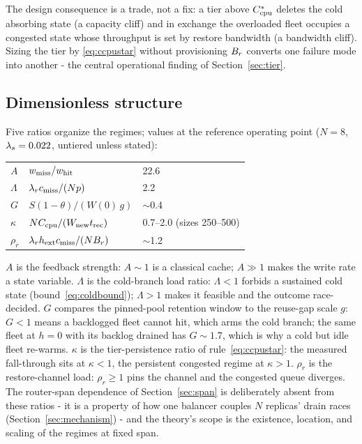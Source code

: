 The design consequence is a trade, not a fix: a tier above $C_{\mathrm{cpu}}^*$
deletes the cold absorbing state (a capacity cliff) and in exchange
the overloaded fleet occupies a congested state whose throughput is
set by restore bandwidth (a bandwidth cliff). Sizing the tier by \eqref{eq:ccpustar}
without provisioning $B_r$ converts one failure mode into another -
the central operational finding of Section~\ref{sec:tier}.

\subsection{Dimensionless structure}
\label{sec:dimensionless}

Five ratios organize the regimes; values at the reference operating
point ($N = 8$, $\lambda_s = 0.022$, untiered unless stated):

\begin{center}
\begin{tabular}{@{}lll@{}}
\toprule
$A$ & $w_{\mathrm{miss}} / w_{\mathrm{hit}}$ & 22.6 \\
$\Lambda$ & $\lambda_r c_{\mathrm{miss}} / (N p)$ & 2.2 \\
$G$ & $S (1 - \theta) / (W(0)\, g)$ & $\sim$0.4 \\
$\kappa$ & $N C_{\mathrm{cpu}} / (W_{\mathrm{new}} t_{\mathrm{rec}})$ & 0.7--2.0 (sizes 250--500) \\
$\rho_r$ & $\lambda_r h_{\mathrm{ext}} c_{\mathrm{miss}} / (N B_r)$ & $\sim$1.2 \\
\bottomrule
\end{tabular}
\end{center}

$A$ is the feedback strength: $A \sim 1$ is a classical cache; $A \gg 1$ makes
the write rate a state variable. $\Lambda$ is the cold-branch load
ratio: $\Lambda < 1$ forbids a sustained cold state (bound~\eqref{eq:coldbound});
$\Lambda > 1$ makes it feasible and the outcome race-decided. $G$
compares the pinned-pool retention window to the reuse-gap scale $g$:
$G < 1$ means a backlogged fleet cannot hit, which arms the cold
branch; the same fleet at $h = 0$ with its backlog drained has
$G \sim 1.7$, which is why a cold but idle fleet re-warms. $\kappa$ is the
tier-persistence ratio of rule~\eqref{eq:ccpustar}: the measured fall-through sits
at $\kappa < 1$, the persistent congested regime at $\kappa > 1$. $\rho_r$ is
the restore-channel load: $\rho_r \geq 1$ pins the channel and the
congested queue diverges. The router-span dependence of Section~\ref{sec:span} is
deliberately absent from these ratios - it is a property of how one
balancer couples $N$ replicas' drain races (Section~\ref{sec:mechanism}) - and the
theory's scope is the existence, location, and scaling of the
regimes at fixed span.

